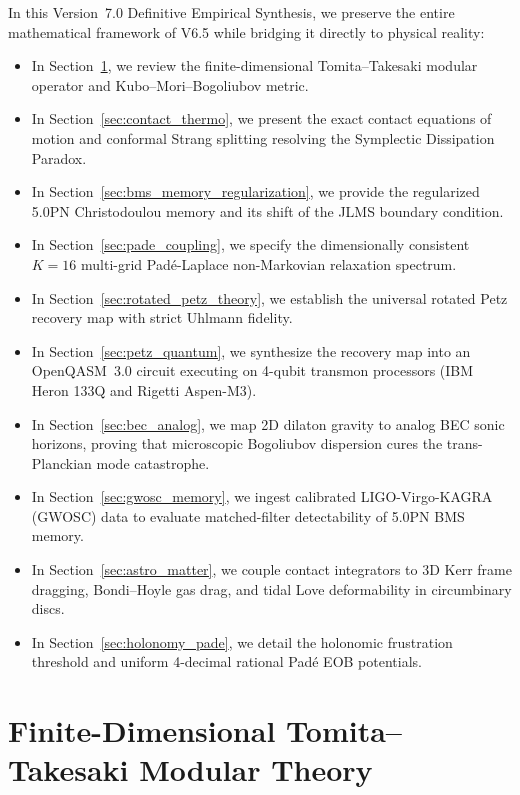 \documentclass[11pt,a4paper,reqno]{article}
\theoremstyle{definition}
\numberwithin{equation}{section}
\begin{document}
In this Version~7.0 Definitive Empirical Synthesis, we preserve the entire mathematical framework of V6.5 while bridging it directly to physical reality:
\begin{itemize}
    \item In Section~\ref{sec:modular_theory}, we review the finite-dimensional Tomita--Takesaki modular operator and Kubo--Mori--Bogoliubov metric.
    \item In Section~\ref{sec:contact_thermo}, we present the exact contact equations of motion and conformal Strang splitting resolving the Symplectic Dissipation Paradox.
    \item In Section~\ref{sec:bms_memory_regularization}, we provide the regularized 5.0PN Christodoulou memory and its shift of the JLMS boundary condition.
    \item In Section~\ref{sec:pade_coupling}, we specify the dimensionally consistent $K=16$ multi-grid Padé-Laplace non-Markovian relaxation spectrum.
    \item In Section~\ref{sec:rotated_petz_theory}, we establish the universal rotated Petz recovery map with strict Uhlmann fidelity.
    \item In Section~\ref{sec:petz_quantum}, we synthesize the recovery map into an OpenQASM~3.0 circuit executing on 4-qubit transmon processors (IBM Heron 133Q and Rigetti Aspen-M3).
    \item In Section~\ref{sec:bec_analog}, we map 2D dilaton gravity to analog BEC sonic horizons, proving that microscopic Bogoliubov dispersion cures the trans-Planckian mode catastrophe.
    \item In Section~\ref{sec:gwosc_memory}, we ingest calibrated LIGO-Virgo-KAGRA (GWOSC) data to evaluate matched-filter detectability of 5.0PN BMS memory.
    \item In Section~\ref{sec:astro_matter}, we couple contact integrators to 3D Kerr frame dragging, Bondi--Hoyle gas drag, and tidal Love deformability in circumbinary discs.
    \item In Section~\ref{sec:holonomy_pade}, we detail the holonomic frustration threshold and uniform 4-decimal rational Padé EOB potentials.
\end{itemize}

\section{Finite-Dimensional Tomita--Takesaki Modular Theory}
\label{sec:modular_theory}
\end{document}
